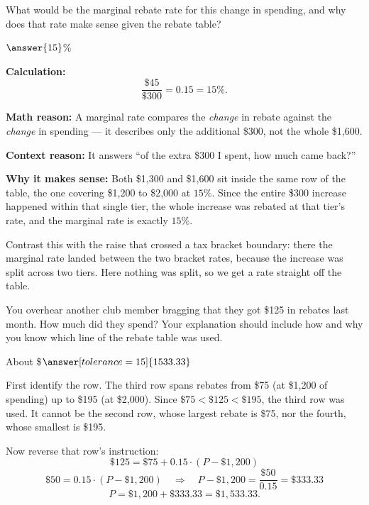 \documentclass[12pt]{ximera}
\begin{document}
\begin{problem}
What would be the marginal rebate rate for this change in spending, and why does that
rate make sense given the rebate table?

$\answer{15}$\%

\begin{freeResponse}
\end{freeResponse}

\begin{solution}
\textbf{Calculation:}
\[
\frac{\$45}{\$300} = 0.15 = 15\%.
\]

\textbf{Math reason:} A marginal rate compares the \emph{change} in rebate against the
\emph{change} in spending --- it describes only the additional \$300, not the whole
\$1,600.

\textbf{Context reason:} It answers ``of the extra \$300 I spent, how much came back?''

\textbf{Why it makes sense:} Both \$1,300 and \$1,600 sit inside the same row of the
table, the one covering \$1,200 to \$2,000 at $15\%$. Since the entire \$300 increase
happened within that single tier, the whole increase was rebated at that tier's rate,
and the marginal rate is exactly $15\%$.

Contrast this with the raise that crossed a tax bracket boundary: there the marginal
rate landed between the two bracket rates, because the increase was split across two
tiers. Here nothing was split, so we get a rate straight off the table.
\end{solution}
\end{problem}

\begin{problem}
You overhear another club member bragging that they got \$125 in rebates last month. How
much did they spend? Your explanation should include how and why you know which line of
the rebate table was used.

About \$$\answer[tolerance=15]{1533.33}$

\begin{freeResponse}
\end{freeResponse}

\begin{solution}
First identify the row. The third row spans rebates from \$75 (at \$1,200 of spending)
up to \$195 (at \$2,000). Since $\$75 < \$125 < \$195$, the third row was used. It
cannot be the second row, whose largest rebate is \$75, nor the fourth, whose smallest
is \$195.

Now reverse that row's instruction:
\[
\$125 = \$75 + 0.15 \cdot (P - \$1{,}200)
\]
\[
\$50 = 0.15 \cdot (P - \$1{,}200)
\quad\Longrightarrow\quad
P - \$1{,}200 = \frac{\$50}{0.15} = \$333.33
\]
\[
P = \$1{,}200 + \$333.33 = \$1{,}533.33.
\]
\end{solution}
\end{problem}
\end{document}
